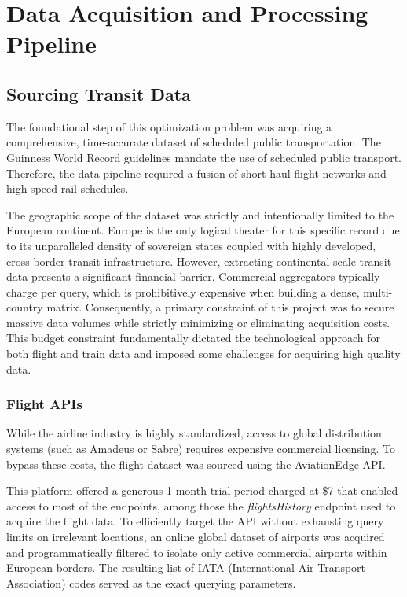 \chapter{Data Acquisition and Processing Pipeline}
\label{chap:data_pipeline}

\section{Sourcing Transit Data}
\label{sec:sourcing_data}
The foundational step of this optimization problem was acquiring a comprehensive, time-accurate dataset of scheduled public transportation. The Guinness World Record guidelines mandate the use of scheduled public transport. Therefore, the data pipeline required a fusion of short-haul flight networks and high-speed rail schedules.

\noindent The geographic scope of the dataset was strictly and intentionally limited to the European continent. Europe is the only logical theater for this specific record due to its unparalleled density of sovereign states coupled with highly developed, cross-border transit infrastructure. However, extracting continental-scale transit data presents a significant financial barrier. Commercial aggregators typically charge per query, which is prohibitively expensive when building a dense, multi-country matrix. Consequently, a primary constraint of this project was to secure massive data volumes while strictly minimizing or eliminating acquisition costs. This budget constraint fundamentally dictated the technological approach for both flight and train data and imposed some challenges for acquiring high quality data.

\subsection{Flight APIs}
\label{subsec:flight_apis}
While the airline industry is highly standardized, access to global distribution systems (such as Amadeus or Sabre) requires expensive commercial licensing. To bypass these costs, the flight dataset was sourced using the AviationEdge API.

This platform offered a generous 1 month trial period charged at \$7 that enabled access to most of the endpoints, among those the \textit{flightsHistory} endpoint used to acquire the flight data. To efficiently target the API without exhausting query limits on irrelevant locations, an online global dataset of airports was acquired and programmatically filtered to isolate only active commercial airports within European borders. The resulting list of IATA (International Air Transport Association) codes served as the exact querying parameters.

